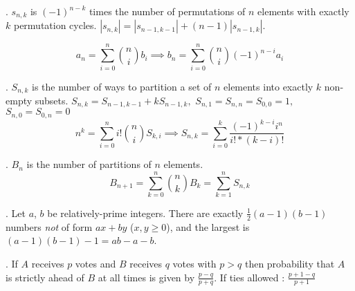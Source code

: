 .
$s_{n,k}$ is $(-1)^{n-k}$ times the number of permutations of $n$ elements with
exactly $k$ permutation cycles.
$|s_{n,k}| = |s_{n-1,k-1}| + (n-1) |s_{n-1,k}|$.

$$a_{n} = {\sum_{i=0}^{n}} \binom {n}{i} b_{i} \implies b_{n} = {\sum_{i=0}^{n}} \binom {n}{i} (-1)^{n-i} a_{i}$$

.
$S_{n,k}$ is the number of ways to partition a set of $n$ elements into
exactly $k$ non-empty subsets.
$S_{n,k} = S_{n-1,k-1} + k S_{n-1,k} \bigg,$ 
$S_{n,1} = S_{n,n} = S_{0,0} = 1 \bigg,$
$S_{n,0} = S_{0,n} = 0$
$$n^{k} = \sum_{i=0}^n i! \binom{n}{i} S_{k,i} \implies S_{n,k} = \sum_{i=0}^{k} {\frac {(-1)^{k-i} i^{n}} {i! * (k-i)!}}$$

. $B_n$ is the number of partitions of $n$ elements.
$$B_{n+1} = \sum_{k=0}^n {n \choose k} B_k = \sum_{k=1}^n S_{n,k}$$

.  Let $a$, $b$ be relatively-prime integers.
There are exactly $\frac{1}{2}(a-1)(b-1)$ numbers \emph{not} of form $ax+by$ ($x,y \ge 0$),
and the largest is $(a-1)(b-1)-1 = ab - a - b$.
 
. If $A$ receives $p$ votes and $B$ receives $q$ votes with $p > q$ then probability that $A$ is strictly ahead of $B$ at all times is given by $\frac{p-q}{p+q}$. If ties allowed : $\frac{p+1-q}{p+1}$
